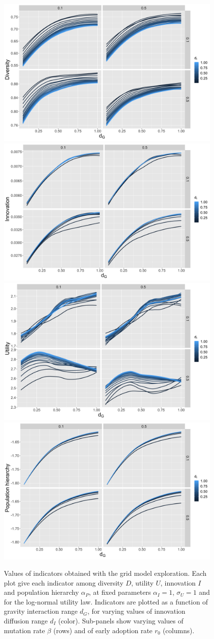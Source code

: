 \documentclass[letterpaper]{article}
\begin{document}
\begin{figure}[t]
	\centering
	\includegraphics[width=0.49\linewidth]{figures/averageDiversity-gravityDecay_color-innovationDecay_facet-mutationRate-earlyAdoptersRate_newInnovationHierarchy1_distriblog-normal.png}
	\includegraphics[width=0.49\linewidth]{figures/averageInnovation-gravityDecay_color-innovationDecay_facet-mutationRate-earlyAdoptersRate_newInnovationHierarchy1_distriblog-normal.png}
	\includegraphics[width=0.49\linewidth]{figures/averageUtility-gravityDecay_color-innovationDecay_facet-mutationRate-earlyAdoptersRate_newInnovationHierarchy1_distriblog-normal.png}
	\includegraphics[width=0.49\linewidth]{figures/finalHierarchy-gravityDecay_color-innovationDecay_facet-mutationRate-earlyAdoptersRate_newInnovationHierarchy1_distriblog-normal.png}
	\caption{Values of indicators obtained with the grid model exploration. Each plot give each indicator among diversity $D$, utility $U$, innovation $I$ and population hierarchy $\alpha_P$, at fixed parameters $\alpha_I = 1$, $\sigma_U = 1$ and for the log-normal utility law. Indicators are plotted as a function of gravity interaction range $d_G$, for varying values of innovation diffusion range $d_I$ (color). Sub-panels show varying values of mutation rate $\beta$ (rows) and of early adoption rate $r_0$ (columns).\label{fig:exploration}}
\end{figure}
\end{document}
